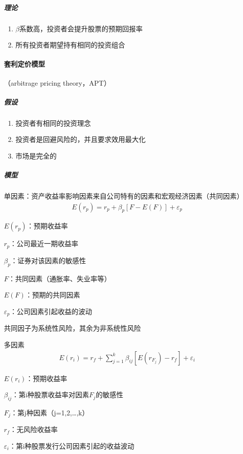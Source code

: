\documentclass[12pt]{book}
\begin{document}
\subparagraph{理论}

\begin{enumerate}[(1)]
  \item $\beta$系数高，投资者会提升股票的预期回报率
  \item 所有投资者期望持有相同的投资组合
\end{enumerate}






\paragraph{套利定价模型}

（arbitrage pricing theory，APT）

\subparagraph{假设}	
\begin{enumerate}[(1)]
  \item 投资者有相同的投资理念
  \item 投资者是回避风险的，并且要求效用最大化
  \item 市场是完全的
\end{enumerate}

\subparagraph{模型}

单因素：资产收益率影响因素来自公司特有的因素和宏观经济因素（共同因素）
\begin{gather*}
  E(r_p )=r_p+\beta_p [F-E(F)]+\varepsilon_p
\end{gather*}
\par $E(r_p)$：预期收益率
\par $r_p$：公司最近一期收益率
\par $\beta_p$：证券对该因素的敏感性
\par $F$：共同因素（通胀率、失业率等）
\par $E(F)$：预期的共同因素
\par $\varepsilon_p$：公司因素引起收益的波动
\par 共同因子为系统性风险，其余为非系统性风险


多因素
\begin{gather*}
  E(r_i) = r_f + \sum_{j=1}^{k}{\beta_{ij} [E(r_{F_j})- r_f]} +\varepsilon_i
\end{gather*}
\par $E(r_i)$：预期收益率
\par $\beta_{ij}$：第i种股票收益率对因素$F_j$的敏感性
\par $F_j$：第j种因素（j=1,2,…,k）
\par $r_f$：无风险收益率
\par $\varepsilon_i$：第i种股票发行公司因素引起的收益波动
\end{document}
